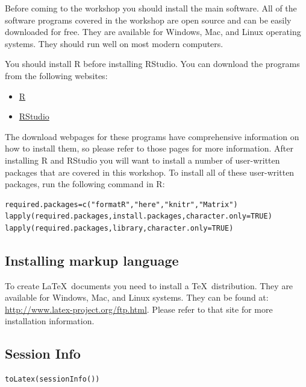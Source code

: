 \documentclass[12pt]{article}
\providecommand{\tightlist}{%
  \setlength{\itemsep}{0pt}\setlength{\parskip}{0pt}}
\begin{document}
Before coming to the workshop you should install the main software. All of the software programs covered in the workshop are open source and can be easily downloaded for free. They are available for Windows, Mac, and
Linux operating systems. They should run well on most modern computers.

You should install R before installing RStudio. You can download the programs from the following websites:

\begin{itemize}
      \tightlist
      \item
            \href{http://www.r-project.org/}{R}\cite{citeR}
      \item
            \href{http://www.rstudio.com/ide/download}{RStudio}\cite{citeRStudio}
\end{itemize}

The download webpages for these programs have comprehensive information on how to install them, so please refer to those pages for more
information. After installing R and RStudio you will want to install a number of user-written packages that are covered in this workshop. To install all of these user-written packages, run the following command in
R:

\begin{verbatim}
required.packages=c("formatR","here","knitr","Matrix")
lapply(required.packages,install.packages,character.only=TRUE)
lapply(required.packages,library,character.only=TRUE)
\end{verbatim}

\hypertarget{installing-markup-language}{%
      \subsection{Installing markup
            language}\label{installing-markup-language}}

To create \LaTeX\ documents you need to install a \TeX\ distribution. They are
available for Windows, Mac, and Linux systems. They can be found at:
\url{http://www.latex-project.org/ftp.html}. Please refer to that site
for more installation information.

\hypertarget{session-info}{%
      \subsection{Session Info}\label{session-info}}

\begin{verbatim}
toLatex(sessionInfo())
\end{verbatim}
\end{document}

